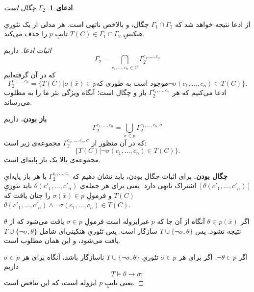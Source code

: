 \documentclass[12pt,a4paper]{report}
\theoremstyle{colorhead}
\newtheorem{claim}[thm]{ادعای}
\begin{document}
\begin{claim}
$\Gamma_2$
چگال است.
\end{claim}
از ادعا نتیجه خواهد شد که 
$\Gamma_1\cap \Gamma_2$
چگال، و بالاخص ناتهی است. هر مدلی از 
یک تئوریِ هنکینیِ
$T(C)\in \Gamma_1\cap \Gamma_2$
تایپِ 
$p$
را حذف می‌کند. 
\begin{proof}[اثبات ادعا]
داریم
\[
\Gamma_2=\bigcap_{c_1,\ldots,c_n\in C} \Gamma_2^{c_1,\ldots,c_n}
\]
که در آن گرفته‌ایم
\[
\Gamma_2^{c_1,\ldots,c_n}=\{T(C)|
\text{$\sigma(\bar{x})\in p$
موجود است به  طوری که
$\neg \sigma(c_1,\ldots,c_n)\in T(C)$
}\}.
\]
ادعا می‌کنیم که هر
$\Gamma_2^{c_1,\ldots,c_n}$
باز و چگال است؛ آنگاه ویژگی بئر ما را به مطلوب می‌رساند.
\par 
\noindent
\textbf{باز بودن.}
داریم
\[
\Gamma_2^{c_1,\ldots,c_n}=\bigcup_{\sigma\in p}
\Gamma_2^{c_1,\ldots,c_n, \sigma}
\]
که در آن
منظور
از
$\Gamma_2^{c_1,\ldots,c_n, \sigma}$
مجموعه‌ی زیر است:
\[
\{T(C)|\neg \sigma(c_1,\ldots,c_n)\in T(C)\}.
\]
مجموعه‌ی بالا یک باز پایه‌ای است. 
\par \noindent
\textbf{چگال بودن.}
برای اثبات چگال بودن،‌ باید نشان دهیم که 
$\Gamma_2^{c_1,\ldots,c_n}$
با هر باز پایه‌ایِ
$[\theta(c'_1,\ldots,c'_n)]$
اشتراک ناتهی دارد.  یعنی برای هر جمله‌ی 
$\theta(c'_1,\ldots,c'_n)$
باید تئوریِ
$T(C)$
و فرمولِ
$\sigma(\bar{x})\in p$
را چنان یافت که
$\theta(c'_1,\ldots,c'_n)\wedge \neg \sigma(c_1,\ldots,c_n)\in T(C)$.
\par 
اگر 
$\theta\in p(\bar{x})$
آنگاه از آن جا که
$p$
غیرایزوله است فرمولِ
$\sigma\in p$
یافت می‌شود که از
$\theta$
نتیجه نشود. پس
$T\cup \{\neg \sigma,\theta\}$
سازگار است. پس تئوریِ هنکینی‌ای شامل
$T\cup \{\neg \sigma,\theta\}$
یافت می‌شود، و این همان مطلوب است.
\par 
اگر
$\neg\theta\in p$.
اگر برای هر
$\sigma\in p$
تئوریِ
$T\cup \{\neg \sigma,\theta\}$
ناسازگار باشد،‌ آنگاه برای هر
$\sigma\in p$
داریم
\[
T\models \theta\to \sigma;
\]
یعنی تایپِ 
$p$
ایزوله است، که این تناقض است. 
\end{proof}
\pagebreak 
\end{document}
